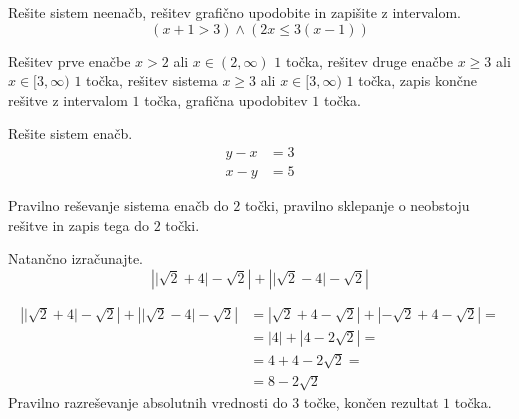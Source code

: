 \documentclass[addpoints]{exam}
\begin{document}
\begin{questions}
        

    \newpage
    \question[5]
    Rešite sistem neenačb, rešitev grafično upodobite in zapišite z intervalom.
    $$ \left(x+1>3\right)\land\left(2x\leq 3(x-1)\right) $$
    
    
    \begin{solution}[11cm]
        Rešitev prve enačbe $x>2$ ali $x\in(2,\infty)$ $1$ točka, rešitev druge enačbe $x\geq 3$ ali $x\in[3,\infty)$ $1$ točka, rešitev sistema $x\geq 3$ ali $x\in[3,\infty)$ $1$ točka, zapis končne rešitve z intervalom $1$ točka, grafična upodobitev $1$ točka.
    \end{solution}


    


    \question[4]
    Rešite sistem enačb.
    $$ \begin{aligned}
        y-x&=3 \\ x-y&=5
    \end{aligned} $$
    
    
    \begin{solution}[8cm]
        Pravilno reševanje sistema enačb do $2$ točki, pravilno sklepanje o neobstoju rešitve in zapis tega do $2$ točki.
    \end{solution}



    
    




    \newpage 

    
    \question[4]
    Natančno izračunajte.
    $$ \left\lvert \lvert\sqrt{2}+4\rvert-\sqrt{2}\right\rvert + \left\lvert \lvert\sqrt{2}-4\rvert-\sqrt{2}\right\rvert $$
    
    
    
    \begin{solution}[10cm]
        \begin{align*}
            \left\lvert \lvert\sqrt{2}+4\rvert-\sqrt{2}\right\rvert + \left\lvert \lvert\sqrt{2}-4\rvert-\sqrt{2}\right\rvert &=
            \left\lvert \sqrt{2}+4-\sqrt{2}\right\rvert + \left\lvert -\sqrt{2}+4-\sqrt{2}\right\rvert= \\
            &= \left\lvert 4\right\rvert + \left\lvert 4-2\sqrt{2}\right\rvert= \\
            &= 4+4-2\sqrt{2}= \\
            &= 8-2\sqrt{2}
        \end{align*}
        Pravilno razreševanje absolutnih vrednosti do $3$ točke, končen rezultat $1$ točka.
    \end{solution}





\end{questions}
\end{document}
